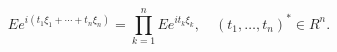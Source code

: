 $$E e^{i(t_1 \xi_1 + \cdots + t_n \xi_n)} = \prod_{k=1}^{n} E e^{it_k \xi_k}, \quad (t_1, \ldots, t_n)^* \in R^n.$$
